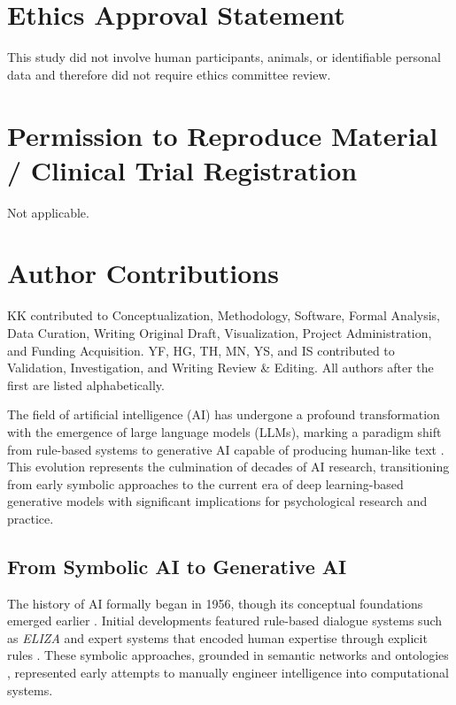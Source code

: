 \documentclass{wiley-article}
\begin{document}
\section*{Ethics Approval Statement}
This study did not involve human participants, animals, or identifiable personal data and therefore did not require ethics committee review.

\section*{Permission to Reproduce Material / Clinical Trial Registration}
Not applicable.

\section*{Author Contributions}
KK contributed to Conceptualization, Methodology, Software, Formal Analysis, Data Curation, Writing \textendash{} Original Draft, Visualization, Project Administration, and Funding Acquisition. YF, HG, TH, MN, YS, and IS contributed to Validation, Investigation, and Writing \textendash{} Review \& Editing. All authors after the first are listed alphabetically.

The field of artificial intelligence (AI) has undergone a profound transformation with the emergence of large language models (LLMs), marking a paradigm shift from rule-based systems to generative AI capable of producing human-like text \citep{keExploringFrontiersLLMs2024}. This evolution represents the culmination of decades of AI research, transitioning from early symbolic approaches to the current era of deep learning-based generative models with significant implications for psychological research and practice.

\subsection*{From Symbolic AI to Generative AI}

The history of AI formally began in 1956, though its conceptual foundations emerged earlier \citep{stricklandTurbulentUncertainFuture2021}. Initial developments featured rule-based dialogue systems such as \textit{ELIZA} \citep{rajaramanELIZAChatGPT2023} and expert systems that encoded human expertise through explicit rules \citep{tanApplicationExpertSystem2016}. These symbolic approaches, grounded in semantic networks and ontologies \citep{shu-hsienliaoExpertSystemMethodologies2005,sowa1992semantic}, represented early attempts to manually engineer intelligence into computational systems.
\end{document}
